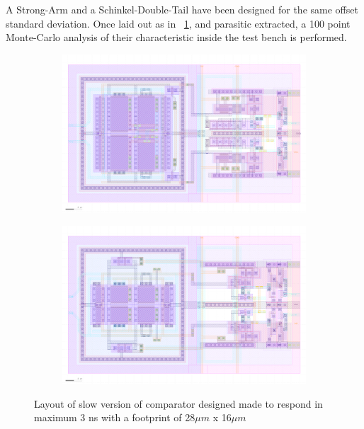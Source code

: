 A Strong-Arm and a Schinkel-Double-Tail have been designed for the same offset standard deviation. Once laid out as in \figurename~\ref{fig:layout-comp}, and parasitic extracted, a 100 point Monte-Carlo analysis of their characteristic inside the test bench is performed.

\begin{figure}[!htp]
    \centering
    \begin{subfigure}[b]{0.48\textwidth}
        \includegraphics[width=\textwidth]{Chapter7/Figs/layout-slow-dtl.png}
    \end{subfigure}
    \begin{subfigure}[b]{0.48\textwidth}
        \includegraphics[width=\textwidth]{Chapter7/Figs/layout-slow-sa.png}
    \end{subfigure}
    \caption{Layout of slow version of comparator designed made to respond in maximum 3 ns with a footprint of 28\(\mu m\) x 16\(\mu m\)}
    \label{fig:layout-comp}
\end{figure}

